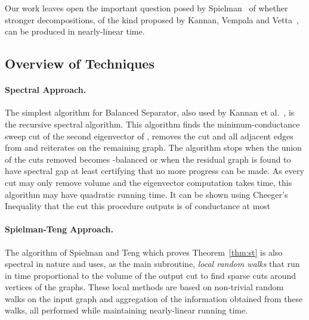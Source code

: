 \documentclass[twoside,leqno,twocolumn]{article}
\newcommand{\BS}{{\sc Balanced Separator}\xspace}
\numberwithin{equation}{section}
\begin{document}
Our work leaves open the important question posed by Spielman~\cite{SpielmanICM} of whether stronger decompositions, of the kind proposed by Kannan, Vempala and Vetta~\cite{Kannan}, can be produced in nearly-linear time.




\subsection{Overview of Techniques}
\paragraph{Spectral Approach.}
The simplest algorithm for \BS, also used by Kannan et al.~\cite{Kannan}, is the recursive spectral algorithm. 
This algorithm finds the minimum-conductance sweep cut of the second eigenvector of ,  removes the cut and all adjacent edges from  and reiterates on the remaining graph. The algorithm stops when the union of the cuts removed becomes -balanced or when the residual graph is found to have spectral gap at least  certifying that no more progress can be made. As every cut may only remove  volume  and the eigenvector computation takes  time, this algorithm may have quadratic running time. It can be shown using Cheeger's Inequality \cite{FAN} that the cut this procedure outputs is of conductance at most  
\paragraph{Spielman-Teng Approach.}
The algorithm of Spielman and Teng which proves Theorem~\ref{thm:st} is also spectral in nature and  uses, as the main subroutine, {\it local random walks} that run in time proportional to the volume of the output cut to find sparse cuts around vertices of the graphs. These local methods are based on  non-trivial random walks on the input graph and aggregation of the information obtained from these walks, all performed while maintaining  nearly-linear running time.
\end{document}
